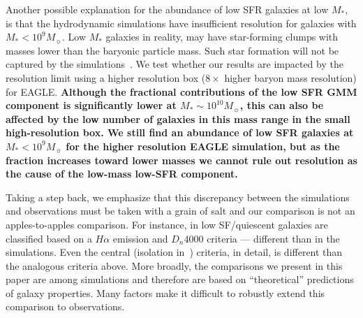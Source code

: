 \documentclass[tighten, preprint]{aastex62}
\begin{document}
Another possible explanation for the abundance of low SFR galaxies
at low $M_*$, is that the hydrodynamic simulations have insufficient
resolution for galaxies with $M_*{<}10^9M_\sun$. Low $M_*$ galaxies 
in reality, may have star-forming clumps with masses lower than the 
baryonic particle mass. Such star formation will not be captured by 
the simulations~\citep{sparre2017a}. We test whether our results are 
impacted by the resolution limit using a higher resolution box ($8\times$ 
higher baryon mass resolution) for EAGLE. 
{\bf \color{red} Although the fractional contributions of the low SFR GMM
component is significantly lower at $M_* \sim 10^{10}M_\sun$, this can also be affected by the low number of galaxies in this mass range in the small high-resolution box. We still find an abundance of low SFR galaxies
at $M_*<10^9M_\sun$ for the higher resolution EAGLE simulation, but as the fraction increases toward lower masses we cannot rule out resolution as the cause of the low-mass low-SFR component. 
}

Taking a step back, we emphasize that this discrepancy between the 
simulations and observations must be taken with a grain of salt and
our comparison is not an apples-to-apples comparison. For instance,
in \cite{geha2012} low SF/quiescent galaxies are classified based on 
a $H\alpha$ emission and $D_n 4000$ criteria --- different than in 
the simulations. Even the central (isolation in~\citealt{geha2012}) 
criteria, in detail, is different than the analogous criteria 
above. More broadly, the comparisons we present in this paper are 
among simulations and therefore are based on ``theoretical'' predictions 
of galaxy properties. Many factors make it difficult 
to robustly extend this comparison to observations. 
\end{document}
